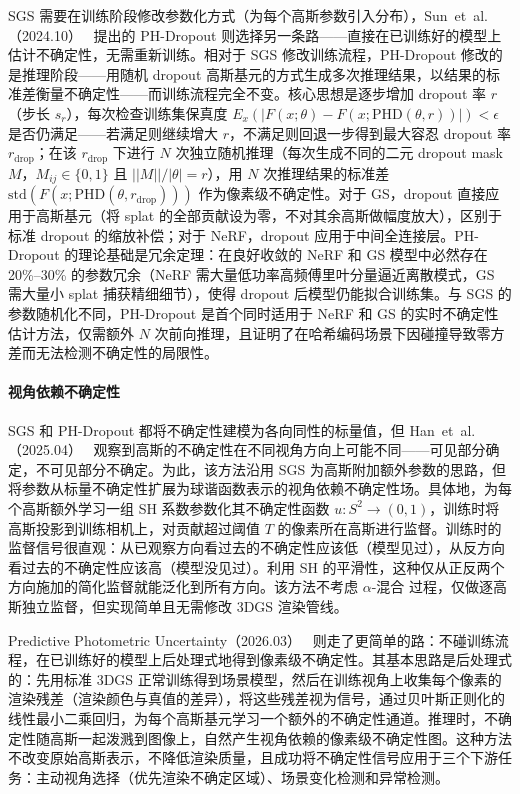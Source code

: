 SGS 需要在训练阶段修改参数化方式（为每个高斯参数引入分布），Sun~et~al.（2024.10）~\cite{2410_05468} 提出的 PH-Dropout 则选择另一条路——直接在已训练好的模型上估计不确定性，无需重新训练。相对于 SGS 修改训练流程，PH-Dropout 修改的是推理阶段——用随机 dropout 高斯基元的方式生成多次推理结果，以结果的标准差衡量不确定性——而训练流程完全不变。核心思想是逐步增加 dropout 率 $r$（步长 $s_r$），每次检查训练集保真度 $E_x(|F(x;\theta) - F(x;\text{PHD}(\theta, r))|) < \epsilon$ 是否仍满足——若满足则继续增大 $r$，不满足则回退一步得到最大容忍 dropout 率 $r_{\text{drop}}$；在该 $r_{\text{drop}}$ 下进行 $N$ 次独立随机推理（每次生成不同的二元 dropout mask $M$，$M_{ij} \in \{0, 1\}$ 且 $||M||/|\theta| = r$），用 $N$ 次推理结果的标准差 $\text{std}(F(x;\text{PHD}(\theta, r_{\text{drop}})))$ 作为像素级不确定性。对于 GS，dropout 直接应用于高斯基元（将 splat 的全部贡献设为零，不对其余高斯做幅度放大），区别于标准 dropout 的缩放补偿；对于 NeRF，dropout 应用于中间全连接层。PH-Dropout 的理论基础是冗余定理：在良好收敛的 NeRF 和 GS 模型中必然存在 20\%--30\% 的参数冗余（NeRF 需大量低功率高频傅里叶分量逼近离散模式，GS 需大量小 splat 捕获精细细节），使得 dropout 后模型仍能拟合训练集。与 SGS 的参数随机化不同，PH-Dropout 是首个同时适用于 NeRF 和 GS 的实时不确定性估计方法，仅需额外 $N$ 次前向推理，且证明了在哈希编码场景下因碰撞导致零方差而无法检测不确定性的局限性。

\paragraph{视角依赖不确定性}

SGS 和 PH-Dropout 都将不确定性建模为各向同性的标量值，但 Han~et~al.（2025.04）~\cite{2504_07370} 观察到高斯的不确定性在不同视角方向上可能不同——可见部分确定，不可见部分不确定。为此，该方法沿用 SGS 为高斯附加额外参数的思路，但将参数从标量不确定性扩展为球谐函数表示的视角依赖不确定性场。具体地，为每个高斯额外学习一组 SH 系数参数化其不确定性函数 $u: S^2 \to (0, 1)$，训练时将高斯投影到训练相机上，对贡献超过阈值 $T$ 的像素所在高斯进行监督。训练时的监督信号很直观：从已观察方向看过去的不确定性应该低（模型见过），从反方向看过去的不确定性应该高（模型没见过）。利用 SH 的平滑性，这种仅从正反两个方向施加的简化监督就能泛化到所有方向。该方法不考虑 $\alpha$-混合 过程，仅做逐高斯独立监督，但实现简单且无需修改 3DGS 渲染管线。

Predictive Photometric Uncertainty（2026.03）~\cite{2603_22786} 则走了更简单的路：不碰训练流程，在已训练好的模型上后处理式地得到像素级不确定性。其基本思路是后处理式的：先用标准 3DGS 正常训练得到场景模型，然后在训练视角上收集每个像素的渲染残差（渲染颜色与真值的差异），将这些残差视为信号，通过贝叶斯正则化的线性最小二乘回归，为每个高斯基元学习一个额外的不确定性通道。推理时，不确定性随高斯一起泼溅到图像上，自然产生视角依赖的像素级不确定性图。这种方法不改变原始高斯表示，不降低渲染质量，且成功将不确定性信号应用于三个下游任务：主动视角选择（优先渲染不确定区域）、场景变化检测和异常检测。

